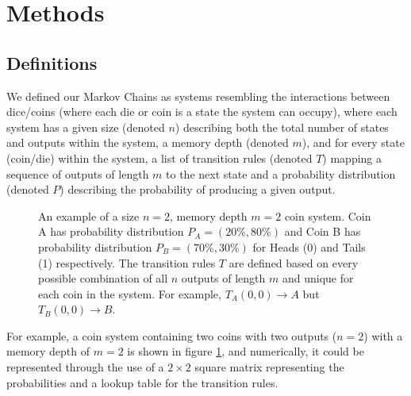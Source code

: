 \documentclass{article}
\begin{document}
\section{Methods}

\subsection{Definitions}

We defined our Markov Chains as systems resembling the interactions between dice/coins (where each die or coin is a state the system can occupy), where each system has a given size (denoted $n$) describing both the total number of states and outputs within the system, a memory depth (denoted $m$), and for every state (coin/die) within the system, a list of transition rules (denoted $T$) mapping a sequence of outputs of length $m$ to the next state and a probability distribution (denoted $P$) describing the probability of producing a given output.

\begin{figure}[H]
\centering

\label{fig:coin-system-example}
\caption{An example of a size $n=2$, memory depth $m=2$ coin system. Coin A has probability distribution $P_{A}=(20\%, 80\%)$ and Coin B has probability distribution $P_{B} = (70\%,30\%)$ for Heads (0) and Tails (1) respectively. The transition rules $T$ are defined based on every possible combination of all $n$ outputs of length $m$ and unique for each coin in the system. For example, $T_{A}(0,0) \rightarrow A$ but $T_{B}(0,0) \rightarrow B$.}
\end{figure}

For example, a coin system containing two coins with two outputs ($n=2$) with a memory depth of $m=2$ is shown in figure \ref{fig:coin-system-example}, and numerically, it could be represented through the use of a $2 \times 2$ square matrix representing the probabilities and a lookup table for the transition rules.

\begin{table}[H]
\centering

\label{tbl:coin-system-numerical-description}
\caption{A continuation of the example shown in figure \ref{fig:coin-system-example}, displaying the probabilities $P$ as a square matrix of size $n \times n$ and the transition rules as a lookup table mapping a series of outputs $m$ long to the next coin in the chain based on the present coin.}
\end{table}
\end{document}
